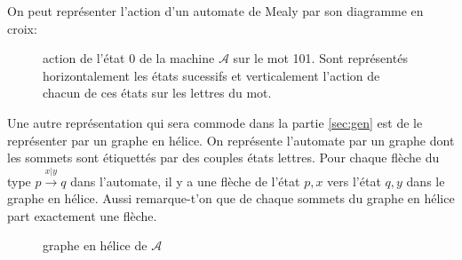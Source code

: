 \documentclass[11pt,a4paper]{article}
\begin{document}
On peut représenter l'action d'un automate de Mealy par son diagramme en croix:

\begin{figure}[h]
  \begin{center}
    \caption{action de l'état 0 de la machine $\mathcal{A}$ sur le mot 101. Sont représentés horizontalement les états sucessifs et verticalement l'action de chacun de ces états sur les lettres du mot.}
  \end{center}
\end{figure}

Une autre représentation qui sera commode dans la partie \ref{sec:gen} est de le représenter par un graphe en hélice. On représente l'automate par un graphe dont les sommets sont étiquettés par des couples états lettres. Pour chaque flèche du type $p\overset{x|y}{\longrightarrow}q$ dans l'automate, il y a une flèche de l'état $p, x$ vers l'état $q, y$ dans le graphe en hélice. Aussi remarque-t'on que de chaque sommets du graphe en hélice part exactement une flèche.

\begin{figure}[h]
  \begin{center}
    \caption{graphe en hélice de $\mathcal{A}$}
  \end{center}
\end{figure}
\end{document}
